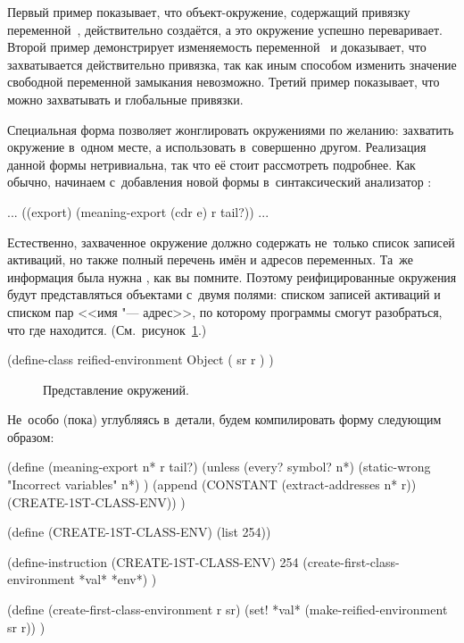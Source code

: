 
Первый пример показывает, что объект-окружение, содержащий привязку
переменной~, действительно создаётся, а  это окружение успешно
переваривает. Второй пример демонстрирует изменяемость переменной~ и
доказывает, что захватывается действительно привязка, так как иным способом
изменить значение свободной переменной замыкания невозможно. Третий пример
показывает, что можно захватывать и глобальные привязки.

Специальная форма  позволяет жонглировать окружениями по желанию:
захватить окружение в~одном месте, а использовать в~совершенно другом.
Реализация данной формы нетривиальна, так что её стоит рассмотреть подробнее.
Как обычно, начинаем с~добавления новой формы в~синтаксический анализатор
:

\begin{code:lisp}
... ((export) (meaning-export (cdr e) r tail?)) ...
\end{code:lisp}

Естественно, захваченное окружение должно содержать не~только список записей
активаций, но также полный перечень имён и адресов переменных. Та~же информация
была нужна , как вы помните. Поэтому реифицированные окружения будут
представляться объектами с~двумя полями: списком записей активаций и списком пар
<<имя "--- адрес>>, по которому программы смогут разобраться, что где находится.
(См.~рисунок~\ref{reflection/reifiy-env/export/pic:reified-env}.)

\begin{code:lisp}
(define-class reified-environment Object
  ( sr r ) )
\end{code:lisp}

\begin{figure}\begin{center}

\end{center}%
\caption{Представление окружений.}%
\label{reflection/reifiy-env/export/pic:reified-env}%
\end{figure}

Не~особо (пока) углубляясь в~детали, будем компилировать форму 
следующим образом:

\begin{code:lisp}
(define (meaning-export n* r tail?)
  (unless (every? symbol? n*)
          (static-wrong "Incorrect variables" n*) )
  (append (CONSTANT (extract-addresses n* r)) (CREATE-1ST-CLASS-ENV)) )

(define (CREATE-1ST-CLASS-ENV) (list 254))

(define-instruction (CREATE-1ST-CLASS-ENV) 254
  (create-first-class-environment *val* *env*) )

(define (create-first-class-environment r sr)
  (set! *val* (make-reified-environment sr r)) )
\end{code:lisp}

